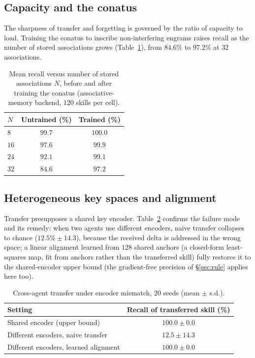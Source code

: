 \documentclass[11pt]{article}
\theoremstyle{definition}
\begin{document}
\subsection{Capacity and the conatus}

The sharpness of transfer and forgetting is governed by the ratio of capacity to load. Training the conatus to inscribe non-interfering engrams raises recall as the number of stored associations grows (Table~\ref{tab:capacity}), from $84.6\%$ to $97.2\%$ at $32$ associations.

\begin{table}[h]
\centering
\caption{Mean recall versus number of stored associations $N$, before and after training the conatus (associative-memory backend, $120$ skills per cell).}
\label{tab:capacity}
\begin{tabular}{lcc}
\toprule
$N$ & Untrained (\%) & Trained (\%) \\
\midrule
$8$  & $99.7$ & $100.0$ \\
$16$ & $97.6$ & $99.9$ \\
$24$ & $92.1$ & $99.1$ \\
$32$ & $84.6$ & $97.2$ \\
\bottomrule
\end{tabular}
\end{table}

\subsection{Heterogeneous key spaces and alignment}
\label{sec:hetero}

Transfer presupposes a shared key encoder. Table~\ref{tab:hetero} confirms the failure mode and its remedy: when two agents use different encoders, naive transfer collapses to chance ($12.5\% \pm 14.3$), because the received delta is addressed in the wrong space; a linear alignment learned from $128$ shared anchors (a closed-form least-squares map, fit from anchors rather than the transferred skill) fully restores it to the shared-encoder upper bound (the gradient-free precision of \S\ref{sec:rule} applies here too).

\begin{table}[h]
\centering
\caption{Cross-agent transfer under encoder mismatch, $20$ seeds (mean $\pm$ s.d.).}
\label{tab:hetero}
\begin{tabular}{lc}
\toprule
Setting & Recall of transferred skill (\%) \\
\midrule
Shared encoder (upper bound) & $100.0 \pm 0.0$ \\
Different encoders, naive transfer & $12.5 \pm 14.3$ \\
Different encoders, learned alignment & $100.0 \pm 0.0$ \\
\bottomrule
\end{tabular}
\end{table}
\end{document}
